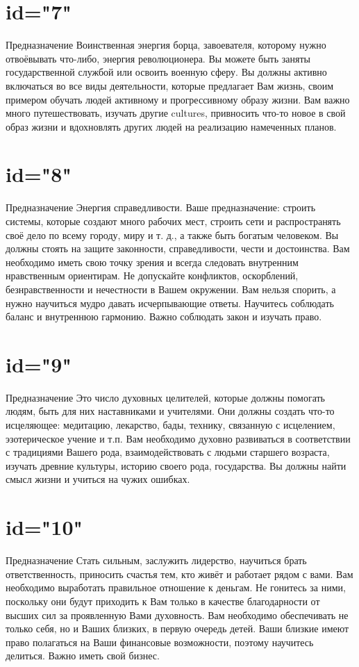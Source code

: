 \section{id="7"}{Предназначение}
Воинственная энергия борца, завоевателя, которому нужно 
отвоёвывать что-либо, энергия революционера.
Вы можете быть заняты государственной службой или освоить 
военную сферу.
Вы должны активно включаться во все виды деятельности, которые 
предлагает Вам жизнь, своим примером обучать людей активному и 
прогрессивному образу жизни.
Вам важно много путешествовать, изучать другие cultures, 
привносить что-то новое в свой образ жизни и вдохновлять 
других людей на реализацию намеченных планов.
\endsection

\section{id="8"}{Предназначение}
Энергия справедливости. Ваше предназначение: строить системы, 
которые создают много рабочих мест, строить сети и распространять 
своё дело по всему городу, миру и т. д., а также быть богатым 
человеком. Вы должны стоять на защите законности, справедливости, 
чести и достоинства.
Вам необходимо иметь свою точку зрения и всегда следовать 
внутренним нравственным ориентирам.
Не допускайте конфликтов, оскорблений, безнравственности и 
нечестности в Вашем окружении.
Вам нельзя спорить, а нужно научиться мудро давать исчерпывающие 
ответы. Научитесь соблюдать баланс и внутреннюю гармонию. 
Важно соблюдать закон и изучать право.
\endsection

\section{id="9"}{Предназначение}
Это число духовных целителей, которые должны помогать людям, 
быть для них наставниками и учителями. Они должны создать 
что-то исцеляющее: медитацию, лекарство, бады, технику, 
связанную с исцелением, эзотерическое учение и т.п. 
Вам необходимо духовно развиваться в соответствии с 
традициями Вашего рода, взаимодействовать с людьми 
старшего возраста, изучать древние культуры, историю 
своего рода, государства.
Вы должны найти смысл жизни и учиться на чужих ошибках.
\endsection

\section{id="10"}{Предназначение}
Стать сильным, заслужить лидерство, научиться брать 
ответственность, приносить счастья тем, кто живёт и 
работает рядом с вами. Вам необходимо выработать 
правильное отношение к деньгам. Не гонитесь за ними, 
поскольку они будут приходить к Вам только в качестве 
благодарности от высших сил за проявленную Вами духовность.
Вам необходимо обеспечивать не только себя, но и Ваших 
близких, в первую очередь детей. Ваши близкие имеют 
право полагаться на Ваши финансовые возможности, 
поэтому научитесь делиться. Важно иметь свой бизнес.
\endsection

